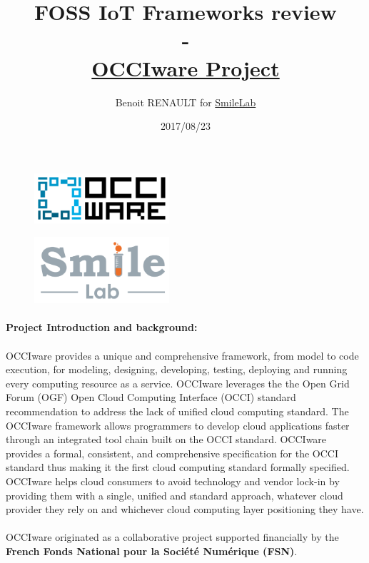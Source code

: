\documentclass{article}
\title{%
  FOSS IoT Frameworks review \\
  - \\
  \large \href{http://www.occiware.org/bin/view/Main/}{OCCIware Project}}
\author{Benoit RENAULT for \href{http://www.smile.fr/Smile-lab}{SmileLab}}
\date{2017/08/23}
\begin{document}
\maketitle

\begin{figure}[ht!]
\centering
\includegraphics[width=50mm]{OCCIware_logo_color_1023x383.png}
\end{figure}

\begin{figure}[ht!]
\centering
\includegraphics[width=50mm]{Smile-lab.png}
\end{figure}

\paragraph{Project Introduction and background:}

\paragraph{} OCCIware provides a unique and comprehensive framework, from model to code execution, for modeling, designing, developing, testing, deploying and running every computing resource as a service. OCCIware leverages the the Open Grid Forum (OGF) Open Cloud Computing Interface (OCCI) standard recommendation to address the lack of unified cloud computing standard. The OCCIware framework allows programmers to develop cloud applications faster through an integrated tool chain built on the OCCI standard. OCCIware provides a formal, consistent, and comprehensive specification for the OCCI standard thus making it the first cloud computing standard formally specified. OCCIware helps cloud consumers to avoid technology and vendor lock-in by providing them with a single, unified and standard approach, whatever cloud provider they rely on and whichever cloud computing layer positioning they have.

\paragraph{} OCCIware originated as a collaborative project supported financially by the \textbf{French Fonds National pour la Société Numérique (FSN)}.
\end{document}
